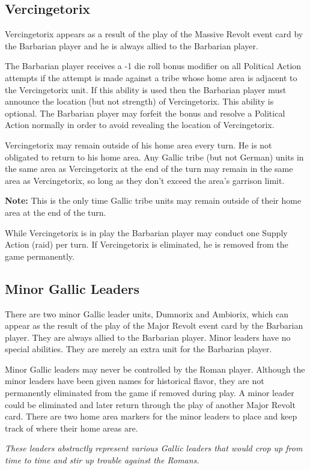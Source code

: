 \subsection{Vercingetorix}
\par
Vercingetorix appears as a result of the play of the Massive Revolt event card by the Barbarian player and he is always allied to the Barbarian player.

The Barbarian player receives a -1 die roll bonus modifier on all Political Action attempts if the attempt is made against a tribe whose home area is adjacent to the Vercingetorix unit. If this ability is used then the Barbarian player must announce the location (but not strength) of Vercingetorix. This ability is optional. The Barbarian player may forfeit the bonus and resolve a Political Action normally in order to avoid revealing the location of Vercingetorix.

Vercingetorix may remain outside of his home area every turn. He is not obligated to return to his home area. Any Gallic tribe (but not German) units in the same area as Vercingetorix at the end of the turn may remain in the same area as Vercingetorix, so long as they don’t exceed the area’s garrison limit.

\textbf{Note:} This is the only time Gallic tribe units may remain outside of their home area at the end of the turn.

While Vercingetorix is in play the Barbarian player may conduct one Supply Action (raid) per turn. If Vercingetorix is eliminated, he is removed from the game permanently.

\subsection{Minor Gallic Leaders}
\par
There are two minor Gallic leader units, Dumnorix and Ambiorix, which can appear as the result of the play of the Major Revolt event card by the Barbarian player. They are always allied to the Barbarian player. Minor leaders have no special abilities. They are merely an extra unit for the Barbarian player.

Minor Gallic leaders may never be controlled by the Roman player. Although the minor leaders have been given names for historical flavor, they are not permanently eliminated from the game if removed during play. A minor leader could be eliminated and later return through the play of another Major Revolt card. There are two home area markers for the minor leaders to place and keep track of where their home areas are.

\textit{These leaders abstractly represent various Gallic leaders that would crop up from time to time and stir up trouble against the Romans.}
